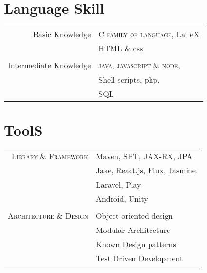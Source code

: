 \documentclass[10pt]{article} %
\begin{document}
{\begin{minipage}[t]{0.44\textwidth}
\begin{tabular}{rl}

\end{tabular}\\[10pt]


\section{Language Skill} 

\begin{tabular}{rl}
Basic Knowledge
& \textsc{C family of language}, \LaTeX\\ 
&HTML \& css\\
& \\

Intermediate Knowledge
& \textsc{java}, \textsc{javascript \& node},\\
& Shell scripts, php,\\
& SQL \\
\end{tabular}


\section{ToolS} 

\begin{tabular}{rl}
\textsc{Library \& Framework}
& Maven, SBT, JAX-RX, JPA\\
& Jake, React.js, Flux, Jasmine. \\
& Laravel, Play \\
& Android, Unity\\
& \\

\textsc{Architecture \& Design}
& Object oriented design\\
& Modular Architecture\\
& Known Design patterns \\
& Test Driven Development\\
&\\


\end{tabular}
\end{minipage}}
\end{document}
